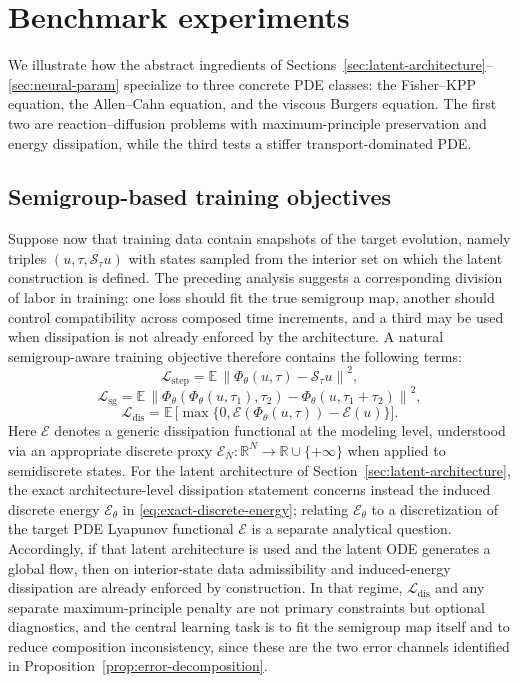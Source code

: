 \documentclass[11pt]{article}
\newcommand{\R}{\mathbb{R}}
\newcommand{\cS}{\mathcal{S}}
\newcommand{\cE}{\mathcal{E}}
\newcommand{\PhiT}{\Phi_{\theta}}
\newcommand{\norm}[1]{\left\lVert #1 \right\rVert}
\begin{document}
\section{Benchmark experiments}\label{sec:benchmark}

We illustrate how the abstract ingredients of Sections~\ref{sec:latent-architecture}--\ref{sec:neural-param} specialize to three concrete PDE classes: the Fisher--KPP equation, the Allen--Cahn equation, and the viscous Burgers equation. The first two are reaction--diffusion problems with maximum-principle preservation and energy dissipation, while the third tests a stiffer transport-dominated PDE.

\subsection{Semigroup-based training objectives}\label{subsec:training}
Suppose now that training data contain snapshots of the target evolution, namely triples $(u,\tau,\cS_{\tau}u)$ with states sampled from the interior set on which the latent construction is defined. The preceding analysis suggests a corresponding division of labor in training: one loss should fit the true semigroup map, another should control compatibility across composed time increments, and a third may be used when dissipation is not already enforced by the architecture. A natural semigroup-aware training objective therefore contains the following terms:
\begin{equation}\label{eq:loss-step}
\mathcal L_{\mathrm{step}}=\mathbb E\,\norm{\PhiT(u,\tau)-\cS_{\tau}u}^2,
\end{equation}
\begin{equation}\label{eq:loss-sg}
\mathcal L_{\mathrm{sg}}=\mathbb E\,\norm{\PhiT(\PhiT(u,\tau_1),\tau_2)-\PhiT(u,\tau_1+\tau_2)}^2,
\end{equation}
\begin{equation}\label{eq:loss-dis}
\mathcal L_{\mathrm{dis}}=\mathbb E\,\bigl[\max\{0,\cE(\PhiT(u,\tau)) - \cE(u)\}\bigr].
\end{equation}
Here $\cE$ denotes a generic dissipation functional at the modeling level, understood via an appropriate discrete proxy $\cE_N:\R^N\to\R\cup\{+\infty\}$ when applied to semidiscrete states. For the latent architecture of Section~\ref{sec:latent-architecture}, the exact architecture-level dissipation statement concerns instead the induced discrete energy $\cE_{\theta}$ in \eqref{eq:exact-discrete-energy}; relating $\cE_{\theta}$ to a discretization of the target PDE Lyapunov functional $\cE$ is a separate analytical question. Accordingly, if that latent architecture is used and the latent ODE generates a global flow, then on interior-state data admissibility and induced-energy dissipation are already enforced by construction. In that regime, $\mathcal L_{\mathrm{dis}}$ and any separate maximum-principle penalty are not primary constraints but optional diagnostics, and the central learning task is to fit the semigroup map itself and to reduce composition inconsistency, since these are the two error channels identified in Proposition~\ref{prop:error-decomposition}.
\end{document}

